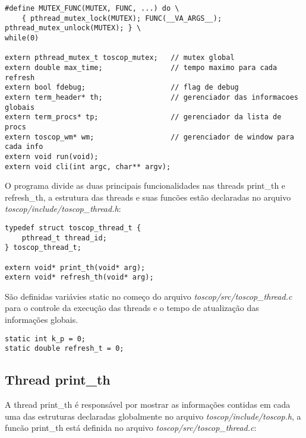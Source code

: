 \documentclass{article}
\begin{document}
\begin{verbatim}
#define MUTEX_FUNC(MUTEX, FUNC, ...) do \
    { pthread_mutex_lock(MUTEX); FUNC(__VA_ARGS__); pthread_mutex_unlock(MUTEX); } \
while(0)

extern pthread_mutex_t toscop_mutex;   // mutex global
extern double max_time;                // tempo maximo para cada refresh
extern bool fdebug;                    // flag de debug
extern term_header* th;                // gerenciador das informacoes globais
extern term_procs* tp;                 // gerenciador da lista de procs
extern toscop_wm* wm;                  // gerenciador de window para cada info
extern void run(void);
extern void cli(int argc, char** argv); 
\end{verbatim}

O programa divide as duas principais funcionalidades nas threads
print\_th e refresh\_th, a estrutura das threads e suas funcões estão 
declaradas no arquivo \textit{toscop/include/toscop\_thread.h}:

\begin{verbatim}
typedef struct toscop_thread_t {
    pthread_t thread_id;
} toscop_thread_t;

extern void* print_th(void* arg);
extern void* refresh_th(void* arg);
\end{verbatim}

São definidas variávies static no começo do arquivo \textit{toscop/src/toscop\_thread.c}
 para o controle da execução das threads e o tempo de atualização das informações globais.

\begin{verbatim}
static int k_p = 0;
static double refresh_t = 0;
\end{verbatim}

\subsection{Thread print\_th}

A thread print\_th é responsável por mostrar as informações contidas
em cada uma das estruturas declaradas globalmente no arquivo 
\textit{toscop/include/toscop.h}, a funcão print\_th está definida 
no arquivo \textit{toscop/src/toscop\_thread.c}:
\end{document}
